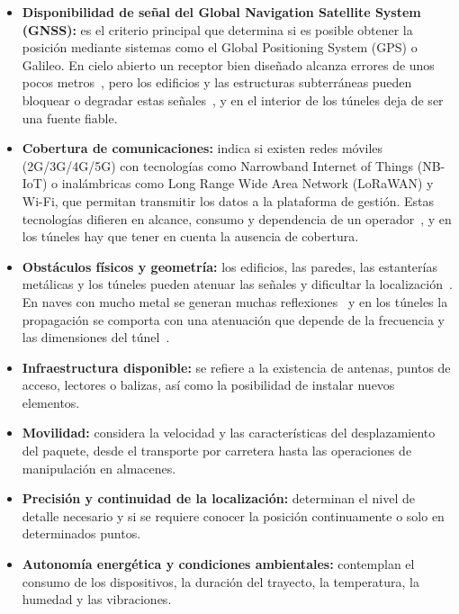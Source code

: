 \documentclass[11pt,a4paper]{article}
\begin{document}
\begin{itemize}
    \item \textbf{Disponibilidad de señal del Global Navigation Satellite System (GNSS):} es el criterio principal que determina si es posible obtener la posición mediante sistemas como el Global Positioning System (GPS) o Galileo. En cielo abierto un receptor bien diseñado alcanza errores de unos pocos metros~\cite{ref1}, pero los edificios y las estructuras subterráneas pueden bloquear o degradar estas señales~\cite{ref2,ref3}, y en el interior de los túneles deja de ser una fuente fiable.

    \item \textbf{Cobertura de comunicaciones:} indica si existen redes móviles (2G/3G/4G/5G) con tecnologías como Narrowband Internet of Things (NB-IoT) o inalámbricas como Long Range Wide Area Network (LoRaWAN) y Wi-Fi, que permitan transmitir los datos a la plataforma de gestión. Estas tecnologías difieren en alcance, consumo y dependencia de un operador~\cite{ref4}, y en los túneles hay que tener en cuenta la ausencia de cobertura.

    \item \textbf{Obstáculos físicos y geometría:} los edificios, las paredes, las estanterías metálicas y los túneles pueden atenuar las señales y dificultar la localización~\cite{ref5}. En naves con mucho metal se generan muchas reflexiones~\cite{ref6} y en los túneles la propagación se comporta con una atenuación que depende de la frecuencia y las dimensiones del túnel~\cite{ref7}.

    \item \textbf{Infraestructura disponible:} se refiere a la existencia de antenas, puntos de acceso, lectores o balizas, así como la posibilidad de instalar nuevos elementos.

    \item \textbf{Movilidad:} considera la velocidad y las características del desplazamiento del paquete, desde el transporte por carretera hasta las operaciones de manipulación en almacenes.

    \item \textbf{Precisión y continuidad de la localización:} determinan el nivel de detalle necesario y si se requiere conocer la posición continuamente o solo en determinados puntos.

    \item \textbf{Autonomía energética y condiciones ambientales:} contemplan el consumo de los dispositivos, la duración del trayecto, la temperatura, la humedad y las vibraciones.
\end{itemize}
\end{document}
